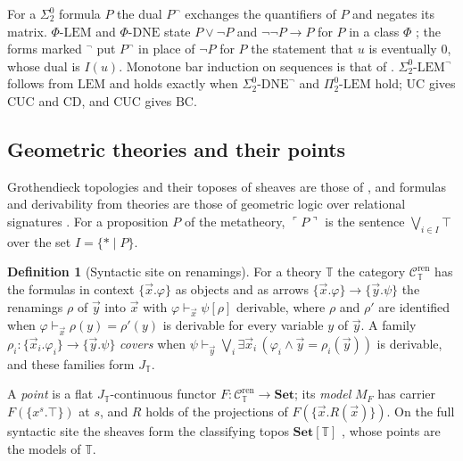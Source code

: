 \documentclass{lmcs}
\theoremstyle{definition}
\newtheorem{definition}[theorem]{Definition}
\theoremstyle{remark}
\newcommand{\Tt}{\mathbb{T}}
\newcommand{\Set}{\mathbf{Set}}
\newcommand{\prin}[1]{\mathrm{#1}}
\newcommand{\EM}{\prin{LEM}}
\newcommand{\UC}{\prin{UC}}
\newcommand{\EIO}{\Sigma^0_2\text{-}\prin{LEM}^{\neg}}
\newcommand{\CD}{\prin{CD}}
\newcommand{\Der}{\vdash}
\newcommand{\Csyn}[1]{\mathcal{C}^{\mathrm{ren}}_{#1}}
\newcommand{\Jsyn}[1]{J_{#1}}
\newcommand{\Clf}[1]{\Set[#1]}
\newcommand{\MF}[1]{M_{#1}}
\newcommand{\pprop}[1]{\ulcorner #1\urcorner}
\providecommand{\SDNE}{\Sigma^0_2\text{-}\prin{DNE}^{\neg}}
\providecommand{\PLEM}{\Pi^0_2\text{-}\prin{LEM}}
\providecommand{\CUC}{\prin{CUC}}
\providecommand{\BC}{\prin{BC}}
\providecommand{\CUC}{\prin{CUC}}
\providecommand{\BC}{\prin{BC}}
\providecommand{\SDNE}{\Sigma^0_2\text{-}\prin{DNE}^{\neg}}
\providecommand{\PLEM}{\Pi^0_2\text{-}\prin{LEM}}
\begin{document}
For a $\Sigma^0_2$ formula $P$ the dual $P^{\neg}$ exchanges the quantifiers of $P$ and negates its matrix.
$\Phi\text{-}\prin{LEM}$ and $\Phi\text{-}\prin{DNE}$ state $P\vee\neg P$ and $\neg\neg P\to P$ for $P$ in a class
$\Phi$ \cite{ABHK04}; the forms marked ${}^{\neg}$ put $P^{\neg}$ in
place of $\neg P$ for $P$ the statement that $u$ is eventually $0$, whose dual is $I(u)$. Monotone bar induction
on sequences is that of \cite{TvD88}. $\EIO$ follows from $\EM$ and holds exactly when
$\SDNE$ and $\PLEM$ hold; $\UC$ gives $\CUC$ and
$\CD$, and $\CUC$ gives $\BC$.

\subsection{Geometric theories and their points}\label{ssec:geometric}

Grothendieck topologies and their toposes of sheaves are those of \cite[Expos\'es~II and~IV]{SGA4},
and formulas and derivability from theories are those of geometric logic over relational signatures
\cite{CL25a}.
For a proposition $P$ of the metatheory, $\pprop{P}$ is the sentence $\bigvee_{i\in I}\top$ over the set
$I=\{\ast\mid P\}$.

\begin{definition}[Syntactic site on renamings]\label{def:synsite}
For a theory $\Tt$ the category $\Csyn{\Tt}$ has the formulas in context $\{\vec x.\varphi\}$ as objects and as
arrows $\{\vec x.\varphi\}\to\{\vec y.\psi\}$ the renamings $\rho$ of $\vec y$ into $\vec x$ with
$\varphi\Der_{\vec x}\psi[\rho]$ derivable, where $\rho$ and $\rho'$ are identified when
$\varphi\Der_{\vec x}\rho(y)=\rho'(y)$ is derivable for every variable $y$ of $\vec y$. A family
$\rho_i\colon\{\vec x_i.\varphi_i\}\to\{\vec y.\psi\}$ \emph{covers} when
$\psi\Der_{\vec y}\bigvee_i\exists\vec x_i\,(\varphi_i\wedge\vec y=\rho_i(\vec y))$ is derivable, and these
families form $\Jsyn{\Tt}$.
\end{definition}

A \emph{point} is a flat $\Jsyn{\Tt}$-continuous functor $F\colon\Csyn{\Tt}\to\Set$; its \emph{model} $\MF{F}$ has
carrier $F(\{x^s.\top\})$ at $s$, and $R$ holds of the projections of
$F(\{\vec x.R(\vec x)\})$.
On the full syntactic site \cite{CL25a} the sheaves form the classifying topos $\Clf{\Tt}$
\cite{Johnstone02}, whose points are the models of $\Tt$.
\end{document}
